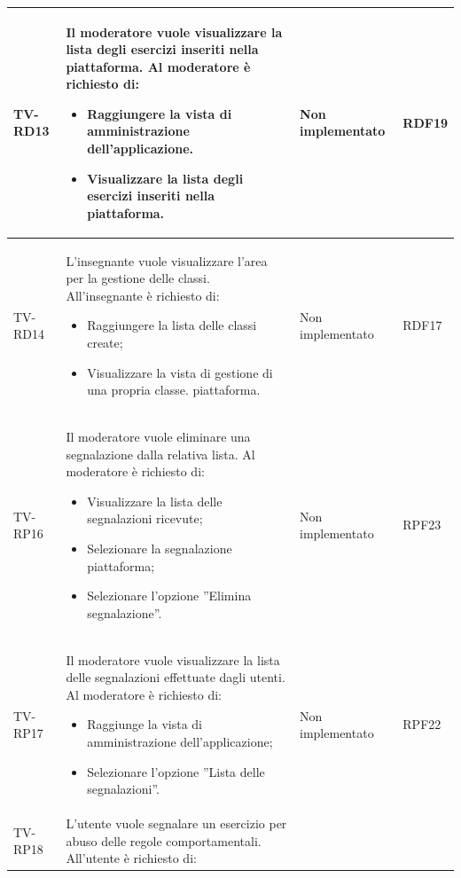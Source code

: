 \begin{longtable}{|>{\centering\arraybackslash}m{1.6cm}|>{\centering\arraybackslash}m{6.41cm}|>{\centering\arraybackslash}m{3.1cm} | >{\centering\arraybackslash}m{2.6cm}|}
		  \rowcolor{LightGray}
TV-RD13 & Il moderatore vuole visualizzare la lista degli esercizi inseriti nella piattaforma. Al moderatore è richiesto di:

\begin{itemize}
 \item Raggiungere la vista di amministrazione dell’applicazione.
 \item Visualizzare la lista degli esercizi inseriti nella piattaforma.
\end{itemize} & Non implementato & RDF19 \\ \hline

TV-RD14 & L’insegnante vuole visualizzare l’area per la gestione delle classi. All'insegnante è richiesto di:

\begin{itemize}
 \item Raggiungere la lista delle classi create;
 \item Visualizzare la vista di gestione di una propria classe. piattaforma.
\end{itemize} & Non implementato & RDF17 \\ \hline

		  \rowcolor{LightGray}
TV-RP16 & Il moderatore vuole eliminare una segnalazione dalla relativa lista. Al moderatore è richiesto di:

\begin{itemize}
 \item Visualizzare la lista delle segnalazioni ricevute;
 \item Selezionare la segnalazione piattaforma;
 \item Selezionare l’opzione ”Elimina segnalazione”.
\end{itemize} & Non implementato & RPF23 \\ \hline
TV-RP17 & Il moderatore vuole visualizzare la lista delle segnalazioni effettuate dagli utenti. Al moderatore è richiesto di:

\begin{itemize}
 \item Raggiunge la vista di amministrazione dell’applicazione;
 \item Selezionare l’opzione ”Lista delle segnalazioni”.
\end{itemize} & Non implementato & RPF22 \\ \hline

		  \rowcolor{LightGray}
TV-RP18 & L’utente vuole segnalare un esercizio per abuso delle regole comportamentali. All'utente è richiesto di:


\end{longtable}
